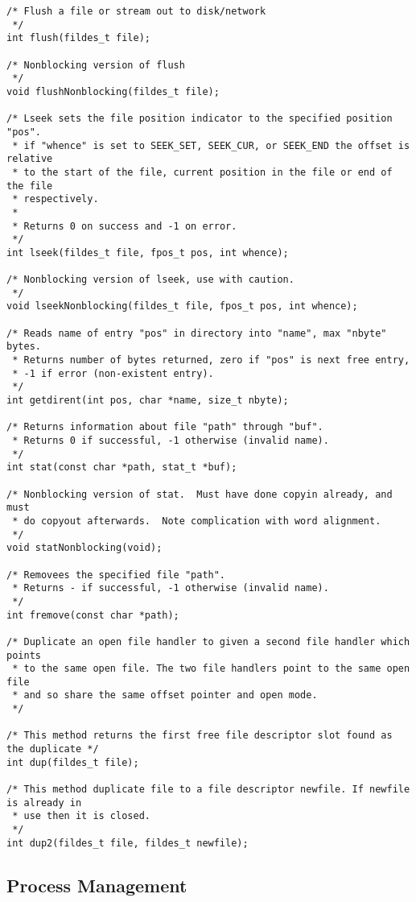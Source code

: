 \documentclass[12pt,english]{article}
\begin{document}
\begin{verbatim}
/* Flush a file or stream out to disk/network
 */
int flush(fildes_t file);

/* Nonblocking version of flush
 */
void flushNonblocking(fildes_t file);

/* Lseek sets the file position indicator to the specified position "pos".
 * if "whence" is set to SEEK_SET, SEEK_CUR, or SEEK_END the offset is relative
 * to the start of the file, current position in the file or end of the file
 * respectively.
 *
 * Returns 0 on success and -1 on error.
 */
int lseek(fildes_t file, fpos_t pos, int whence);

/* Nonblocking version of lseek, use with caution.
 */
void lseekNonblocking(fildes_t file, fpos_t pos, int whence); 

/* Reads name of entry "pos" in directory into "name", max "nbyte" bytes.
 * Returns number of bytes returned, zero if "pos" is next free entry,
 * -1 if error (non-existent entry).
 */
int getdirent(int pos, char *name, size_t nbyte);

/* Returns information about file "path" through "buf".
 * Returns 0 if successful, -1 otherwise (invalid name).
 */
int stat(const char *path, stat_t *buf);

/* Nonblocking version of stat.  Must have done copyin already, and must
 * do copyout afterwards.  Note complication with word alignment.
 */
void statNonblocking(void);

/* Removees the specified file "path".
 * Returns - if successful, -1 otherwise (invalid name).
 */
int fremove(const char *path);

/* Duplicate an open file handler to given a second file handler which points
 * to the same open file. The two file handlers point to the same open file
 * and so share the same offset pointer and open mode.
 */

/* This method returns the first free file descriptor slot found as the duplicate */
int dup(fildes_t file);

/* This method duplicate file to a file descriptor newfile. If newfile is already in
 * use then it is closed.
 */
int dup2(fildes_t file, fildes_t newfile);
\end{verbatim}

\subsection{Process Management} \label{syscalls:process}


\end{document}
